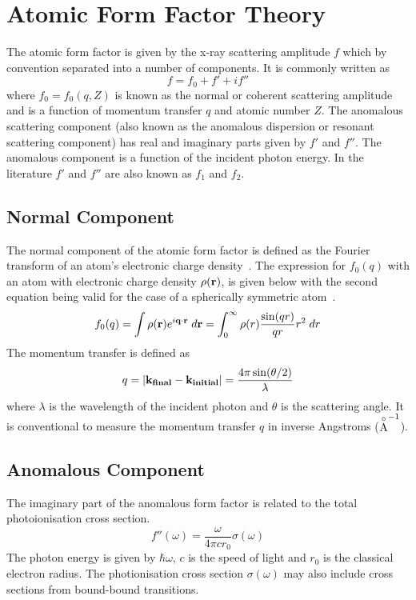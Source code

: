 
\section{Atomic Form Factor Theory}
The atomic form factor is given by the x-ray scattering amplitude $f$ 
which by convention separated into a number of components. 
It is commonly written as~\cite{Chantler-Book}
\begin{equation}
    f = f_0 + f' + if''
\end{equation}
where $f_0 = f_0(q,Z)$ is known as the normal or coherent scattering amplitude
and is a function of momentum transfer $q$ and atomic number $Z$.
The anomalous scattering component (also known as the anomalous dispersion or
resonant scattering component) has real and imaginary parts given by $f'$ and
$f''$. The anomalous component is a function of the incident photon energy.
In the literature $f'$ and $f''$ are also known as $f_1$ and $f_2$.

\subsection{Normal Component}
The normal component of the atomic form factor is defined as the Fourier
transform of an atom's electronic charge density~\cite{Crasemann}.
The expression for $f_0(q)$ with an atom with electronic charge density
$\rho(\mathbf{r})$, is given below with the second equation being valid for the case
of a spherically symmetric atom~\cite{Chantler-Book}.
\begin{equation} \label{eq:nff-spherical}
    f_0(q) = \int \rho(\mathbf{r}) e^{i\mathbf{q}\cdot\mathbf{r}} \; d\mathbf{r}
           = \int_0^\infty \rho(r) \frac{\sin(qr)}{qr} r^2 \; dr
\end{equation}
The momentum transfer is defined as
\begin{equation}
    q = |\mathbf{k_{final}} - \mathbf{k_{initial}}| = \frac{4\pi \sin(\theta/2)}{\lambda}
\end{equation}
where $\lambda$ is the wavelength of the incident photon and $\theta$ is the
scattering angle. It is conventional to measure the momentum transfer $q$
in inverse Angstroms ($\stackrel{\circ}{\mathrm{A}}^{-1}$).
  
\subsection{Anomalous Component}
The imaginary part of the anomalous form factor is related to the total
photoionisation cross section.
\begin{equation} \label{eq:fpp-sigma}
    f''(\omega) = \frac{\omega}{4\pi c r_0} \sigma(\omega)
\end{equation}
The photon energy is given by $\hbar\omega$, $c$ is the speed of light and $r_0$
is the classical electron radius. The photionisation cross section 
$\sigma(\omega)$ may also include cross sections from bound-bound
transitions.


